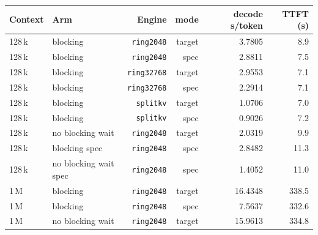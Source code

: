 \begin{tabular}{llrrrr}
\toprule
Context & Arm & Engine & mode & decode s/token & TTFT (s) \\
\midrule
128\,k & blocking & \texttt{ring2048} & target & 3.7805 & 8.9 \\
128\,k & blocking & \texttt{ring2048} & spec & 2.8811 & 7.5 \\
128\,k & blocking & \texttt{ring32768} & target & 2.9553 & 7.1 \\
128\,k & blocking & \texttt{ring32768} & spec & 2.2914 & 7.1 \\
128\,k & blocking & \texttt{splitkv} & target & 1.0706 & 7.0 \\
128\,k & blocking & \texttt{splitkv} & spec & 0.9026 & 7.2 \\
128\,k & no blocking wait & \texttt{ring2048} & target & 2.0319 & 9.9 \\
128\,k & blocking spec & \texttt{ring2048} & spec & 2.8482 & 11.3 \\
128\,k & no blocking wait spec & \texttt{ring2048} & spec & 1.4052 & 11.0 \\
1\,M & blocking & \texttt{ring2048} & target & 16.4348 & 338.5 \\
1\,M & blocking & \texttt{ring2048} & spec & 7.5637 & 332.6 \\
1\,M & no blocking wait & \texttt{ring2048} & target & 15.9613 & 334.8 \\
\bottomrule
\end{tabular}
